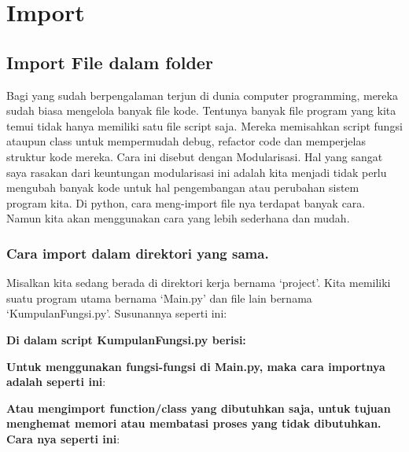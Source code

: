 \chapter{Import}
\section{Import File dalam folder}
\par Bagi yang sudah berpengalaman terjun di dunia computer programming, mereka sudah biasa mengelola banyak file kode. Tentunya banyak file program yang kita temui tidak hanya memiliki satu file script saja. Mereka memisahkan script fungsi ataupun class untuk mempermudah debug, refactor code dan memperjelas struktur kode mereka. Cara ini disebut dengan Modularisasi. Hal yang sangat saya rasakan dari keuntungan modularisasi ini adalah kita menjadi tidak perlu mengubah banyak kode untuk hal pengembangan atau perubahan sistem program kita. Di python, cara meng-import file nya terdapat banyak cara. Namun kita akan menggunakan cara yang lebih sederhana dan mudah.
\subsection{Cara import dalam direktori yang sama.}
Misalkan kita sedang berada di direktori kerja bernama ‘project’. Kita memiliki suatu program utama bernama ‘Main.py’ dan file lain bernama ‘KumpulanFungsi.py’. Susunannya seperti ini:

\par \textbf{Di dalam script KumpulanFungsi.py berisi:}

\par\textbf{Untuk menggunakan fungsi-fungsi di Main.py, maka cara importnya adalah seperti ini}:

\par \textbf{Atau mengimport function/class yang dibutuhkan saja, untuk tujuan menghemat memori atau membatasi proses yang tidak dibutuhkan. Cara nya seperti ini}:

